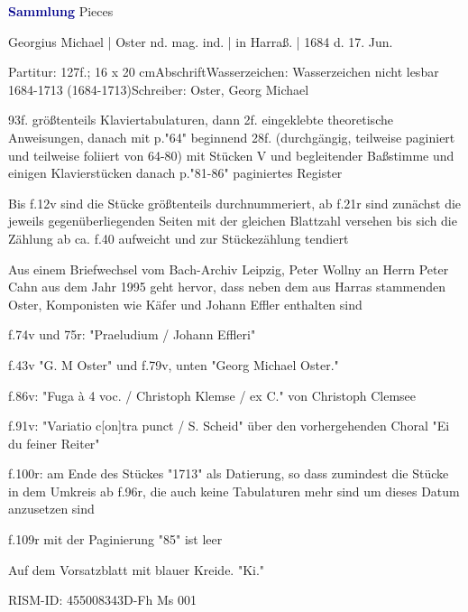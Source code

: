 \documentclass[twocolumn, 12pt]{book}
\begin{document}
\par \vspace{16pt} \textcolor{darkblue}{\textbf{Sammlung}} Pieces
\par \begin{itshape} Georgius Michael | Oster nd. mag. ind. | in Harraß. | 1684 d. 17. Jun.\end{itshape} 
\par \textcolor{darkblue}{}  Partitur: 127f.; 16 x 20 cm\newline Abschrift\newline Wasserzeichen: Wasserzeichen nicht lesbar  1684-1713 (1684-1713)\newline Schreiber: Oster, Georg Michael
\par 93f. größtenteils Klaviertabulaturen, dann 2f. eingeklebte theoretische Anweisungen, danach mit p."64" beginnend 28f. (durchgängig, teilweise paginiert und teilweise foliiert von 64-80) mit Stücken V und begleitender Baßstimme und einigen Klavierstücken danach p."81-86" paginiertes Register
\par Bis f.12v sind die Stücke größtenteils durchnummeriert, ab f.21r sind zunächst die jeweils gegenüberliegenden Seiten mit der gleichen Blattzahl versehen bis sich die Zählung ab ca. f.40 aufweicht und zur Stückezählung tendiert
\par Aus einem Briefwechsel vom Bach-Archiv Leipzig, Peter Wollny an Herrn Peter Cahn aus dem Jahr 1995 geht hervor, dass neben dem aus Harras stammenden Oster, Komponisten wie Käfer und Johann Effler enthalten sind
\par f.74v und 75r: "Praeludium / Johann Effleri"
\par f.43v "G. M Oster" und f.79v, unten "Georg Michael Oster."
\par f.86v: "Fuga à 4 voc. / Christoph Klemse / ex C." von Christoph Clemsee
\par f.91v: "Variatio c[on]tra punct / S. Scheid" über den vorhergehenden Choral "Ei du feiner Reiter"
\par f.100r: am Ende des Stückes "1713" als Datierung, so dass zumindest die Stücke in dem Umkreis ab f.96r, die auch keine Tabulaturen mehr sind um dieses Datum anzusetzen sind
\par f.109r mit der Paginierung "85" ist leer
\par Auf dem Vorsatzblatt mit blauer Kreide. "Ki."
\par RISM-ID: 455008343\newline D-Fh  Ms 001
\end{document}

